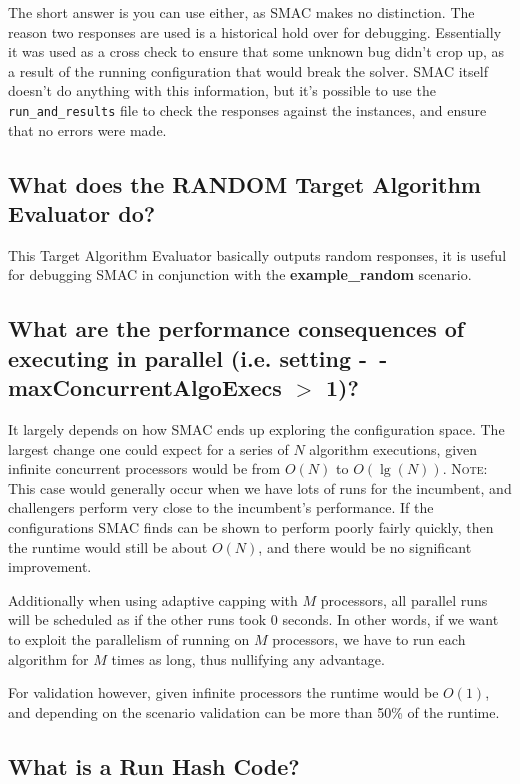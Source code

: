 \documentclass[11pt,letterpaper,oneside]{article}
\begin{document}
The short answer is you can use either, as SMAC makes no distinction. The reason two responses are used is a historical hold over for debugging. Essentially it was used as a cross check to ensure that some unknown bug didn't crop up, as a result of the running configuration that would break the solver. SMAC itself doesn't do anything with this information, but it's possible to use the \texttt{run\_and\_results} file to check the responses against the instances, and ensure that no errors were made.

\subsection{What does the RANDOM Target Algorithm Evaluator do?}

This Target Algorithm Evaluator basically outputs random responses, it is useful for debugging SMAC in conjunction with the \textbf{example\_random} scenario.

\subsection{What are the performance consequences of executing in parallel (i.e. setting \textbf{-~$\!$-maxConcurrentAlgoExecs} $>$ 1)?}
	
	It largely depends on how SMAC ends up exploring the configuration space. The largest change one could expect for a series of $N$ algorithm executions, given infinite concurrent processors would be from $O(N)$ to $O(\lg(N))$. \textsc{Note:} This case would generally occur when we have lots of runs for the incumbent, and challengers perform very close to the incumbent's performance. If the configurations SMAC finds can be shown to perform poorly fairly quickly, then the runtime would still be about $O(N)$, and there would be no significant improvement.
	
	Additionally when using adaptive capping with $M$ processors, all parallel runs will be scheduled as if the other runs took 0 seconds. In other words, if we want to exploit the parallelism of running on $M$ processors, we have to run each algorithm for $M$ times as long, thus nullifying any advantage.
	
	For validation however, given infinite processors the runtime would be $O(1)$, and depending on the scenario validation can be more than 50\% of the runtime.


\subsection{What is a Run Hash Code?}
\end{document}

